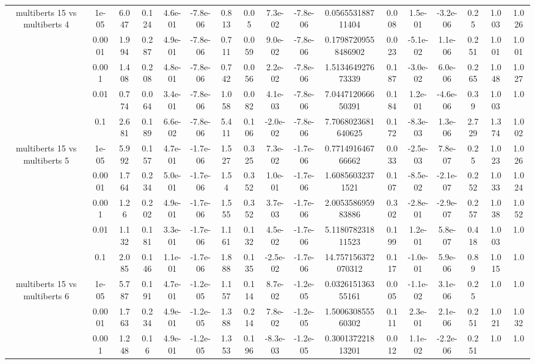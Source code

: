 \begin{tabular}{|c|c|c|c|c|c|c|c|c|c|c|c|c|c|c|c|c|}
\hline
\multirow{5}{*}{multiberts 15 vs multiberts 4} & 1e-05 & 6.047 & 0.124 & 4.6e-01 & -7.8e-06 & 0.813 & 0.05 & 7.3e-02 & -7.8e-06 & 0.056553188711404 & 0.008 & 1.5e-01 & -3.2e-06 & 0.25 & 1.003 & 1.026 \\
 & 0.0001 & 1.994 & 0.287 & 4.9e-01 & -7.8e-06 & 0.711 & 0.059 & 9.0e-02 & -7.8e-06 & 0.17987209558486902 & 0.023 & -5.1e-02 & 1.1e-06 & 0.251 & 1.001 & 1.001 \\
 & 0.001 & 1.408 & 0.208 & 4.8e-01 & -7.8e-06 & 0.742 & 0.056 & 2.2e-02 & -7.8e-06 & 1.513464927673339 & 0.187 & -3.0e-02 & 6.0e-06 & 0.265 & 1.048 & 1.027 \\
 & 0.01 & 0.774 & 0.064 & 3.4e-01 & -7.8e-06 & 1.058 & 0.082 & 4.1e-03 & -7.8e-06 & 7.044712066650391 & 0.184 & 1.2e-01 & -4.6e-06 & 0.39 & 1.003 & 1.0 \\
 & 0.1 & 2.681 & 0.189 & 6.6e-02 & -7.8e-06 & 5.411 & 0.106 & -2.0e-02 & -7.8e-06 & 7.7068023681640625 & 0.172 & -8.3e-03 & 1.3e-06 & 2.729 & 1.374 & 1.002 \\
\hline
\multirow{5}{*}{multiberts 15 vs multiberts 5} & 1e-05 & 5.992 & 0.157 & 4.7e-01 & -1.7e-06 & 1.527 & 0.325 & 7.3e-02 & -1.7e-06 & 0.771491646766662 & 0.033 & -2.5e-03 & 7.8e-07 & 0.25 & 1.023 & 1.026 \\
 & 0.0001 & 1.764 & 0.234 & 5.0e-01 & -1.7e-06 & 1.54 & 0.352 & 1.0e-01 & -1.7e-06 & 1.60856032371521 & 0.107 & -8.5e-02 & -2.1e-07 & 0.252 & 1.033 & 1.024 \\
 & 0.001 & 1.26 & 0.202 & 4.9e-01 & -1.7e-06 & 1.555 & 0.352 & 3.7e-03 & -1.7e-06 & 2.005358695983886 & 0.302 & -2.8e-01 & -2.9e-07 & 0.257 & 1.038 & 1.052 \\
 & 0.01 & 1.132 & 0.181 & 3.3e-01 & -1.7e-06 & 1.161 & 0.132 & 4.5e-02 & -1.7e-06 & 5.118078231811523 & 0.199 & 1.2e-01 & 5.8e-07 & 0.418 & 1.003 & 1.0 \\
 & 0.1 & 2.085 & 0.146 & 1.1e-01 & -1.7e-06 & 1.888 & 0.135 & -2.5e-02 & -1.7e-06 & 14.757156372070312 & 0.117 & -1.0e-01 & 5.9e-06 & 0.89 & 1.015 & 1.0 \\
\hline
\multirow{5}{*}{multiberts 15 vs multiberts 6} & 1e-05 & 5.787 & 0.191 & 4.7e-01 & -1.2e-05 & 1.157 & 0.114 & 8.7e-02 & -1.2e-05 & 0.032615136355161 & 0.005 & -1.1e-02 & 3.1e-06 & 0.25 & 1.0 & 1.0 \\
 & 0.0001 & 1.763 & 0.234 & 4.9e-01 & -1.2e-05 & 1.388 & 0.214 & 7.8e-02 & -1.2e-05 & 1.500630855560302 & 0.111 & 2.3e-01 & 2.1e-06 & 0.251 & 1.021 & 1.032 \\
 & 0.001 & 1.248 & 0.16 & 4.9e-01 & -1.2e-05 & 1.353 & 0.196 & -8.3e-03 & -1.2e-05 & 0.300137221813201 & 0.012 & 1.1e-02 & -2.2e-06 & 0.251 & 1.0 & 1.0 \\

\end{tabular}

